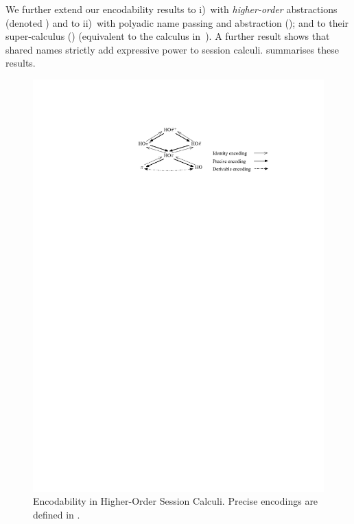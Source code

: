We further extend our encodability results to 
i)~\HOp with \emph{higher-order} abstractions (denoted \HOpp) 
and to ii)~\HOp with polyadic name passing and abstraction (\pHOp); and to
their super-calculus  (\PHOpp) (equivalent to the calculus in~\cite{tlca07}). 
A further result shows that 
shared names
strictly add expressive power 
to session calculi. 
 summarises %
these results.

\begin{figure}[t]
\centering
\includegraphics[scale=1]{diag.pdf}
\vspace{1mm}

	\caption{Encodability in Higher-Order Session Calculi. 
	Precise encodings are defined in .
	\label{fig:express}}
\end{figure}

